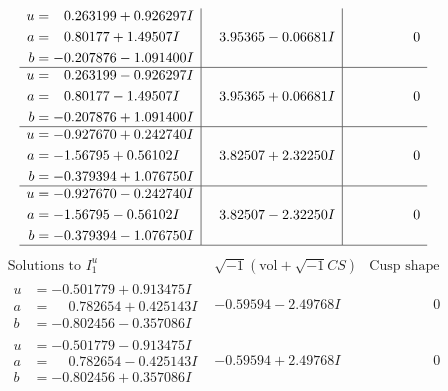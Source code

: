 \documentclass[1p]{elsarticle_modified}
\theoremstyle{definition}
\newcommand{\I}{\sqrt{-1}}
\begin{document}
$$\begin{array}{c|c|c}
\begin{aligned}
u &= \phantom{-}0.263199 + 0.926297 I \\
a &= \phantom{-}0.80177 + 1.49507 I \\
b &= -0.207876 - 1.091400 I\end{aligned}
 & \phantom{-}3.95365 - 0.06681 I & \phantom{-0.000000 } 0 \\ \hline\begin{aligned}
u &= \phantom{-}0.263199 - 0.926297 I \\
a &= \phantom{-}0.80177 - 1.49507 I \\
b &= -0.207876 + 1.091400 I\end{aligned}
 & \phantom{-}3.95365 + 0.06681 I & \phantom{-0.000000 } 0 \\ \hline\begin{aligned}
u &= -0.927670 + 0.242740 I \\
a &= -1.56795 + 0.56102 I \\
b &= -0.379394 + 1.076750 I\end{aligned}
 & \phantom{-}3.82507 + 2.32250 I & \phantom{-0.000000 } 0 \\ \hline\begin{aligned}
u &= -0.927670 - 0.242740 I \\
a &= -1.56795 - 0.56102 I \\
b &= -0.379394 - 1.076750 I\end{aligned}
 & \phantom{-}3.82507 - 2.32250 I & \phantom{-0.000000 } 0\\
 \hline 
 \end{array}$$\newpage$$\begin{array}{c|c|c}  
\text{Solutions to }I^u_{1}& \I (\text{vol} + \sqrt{-1}CS) & \text{Cusp shape}\\
 \hline 
\begin{aligned}
u &= -0.501779 + 0.913475 I \\
a &= \phantom{-}0.782654 + 0.425143 I \\
b &= -0.802456 - 0.357086 I\end{aligned}
 & -0.59594 - 2.49768 I & \phantom{-0.000000 } 0 \\ \hline\begin{aligned}
u &= -0.501779 - 0.913475 I \\
a &= \phantom{-}0.782654 - 0.425143 I \\
b &= -0.802456 + 0.357086 I\end{aligned}
 & -0.59594 + 2.49768 I & \phantom{-0.000000 } 0 \\ \hline\begin{aligned}

\end{aligned}
\end{array}$$
\end{document}
